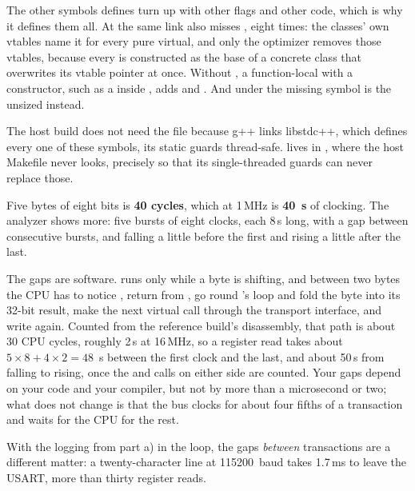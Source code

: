 The other symbols  defines turn up with other flags and other code, which is why it
defines them all. At  the same link also misses , eight times:
the  classes' own vtables name it for every pure virtual, and only the optimizer
removes those vtables, because every  is constructed as the base of a concrete class
that overwrites its vtable pointer at once. Without , a
function-local  with a constructor, such as a  inside , adds  and .
And under  the missing symbol is the unsized
 instead.

The host build does not need the file because g++ links libstdc++, which defines every one of these
symbols, its static guards thread-safe.  lives in , where the host Makefile
never looks, precisely so that its single-threaded guards can never replace those.

 Five bytes of eight bits is \textbf{40  cycles}, which at 1\,MHz is \textbf{40\,\textmu
s} of clocking. The analyzer shows more: five bursts of eight clocks, each 8\,\textmu s long, with a
gap between consecutive bursts, and  falling a little before the first and rising a little
after the last.

The gaps are software.  runs only while a byte is shifting, and between two bytes the CPU
has to notice , return from , go round 's loop and fold the
byte into its 32-bit result, make the next virtual call through the transport interface, and write
 again. Counted from the reference build's disassembly, that path is about 30 CPU cycles,
roughly 2\,\textmu s at 16\,MHz, so a register read takes about $5 \times 8 + 4 \times 2 = 48$\,\textmu
s between the first clock and the last, and about 50\,\textmu s from  falling to 
rising, once the  and  calls on either side are counted. Your gaps depend on
your code and your compiler, but not by more than a microsecond or two; what does not change is that
the bus clocks for about four fifths of a transaction and waits for the CPU for the rest.

With the logging from part a) in the loop, the gaps \emph{between} transactions are a different
matter: a twenty-character line at 115200~baud takes 1.7\,ms to leave the USART, more than thirty
register reads.

